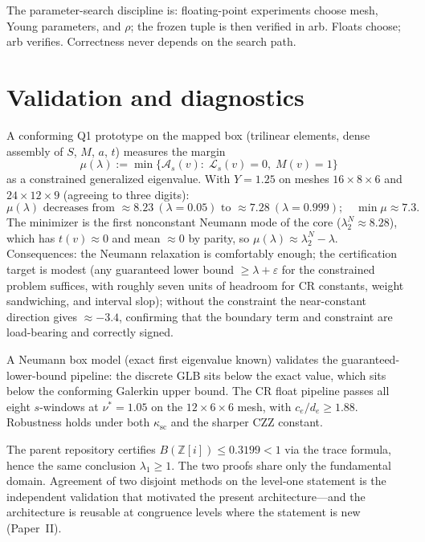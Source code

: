 \documentclass[11pt]{amsart}
\newcommand{\ZZ}{\mathbb{Z}}
\begin{document}
The parameter-search discipline is: floating-point experiments choose
mesh, Young parameters, and $\rho$; the frozen tuple is then verified in
arb.  Floats choose; arb verifies.  Correctness never depends on the
search path.

\section{Validation and diagnostics}\label{sec:valid}

A conforming Q1 prototype on the mapped box
(trilinear elements, dense assembly of $S$, $M$, $a$, $t$) measures the
margin
\[
  \mu(\lambda):=\min\bigl\{\mathcal{A}_s(v):\;\mathcal{L}_s(v)=0,\;
  M(v)=1\bigr\}
\]
as a constrained generalized eigenvalue.  With $Y=1.25$ on meshes
$16\times 8\times 6$ and $24\times 12\times 9$ (agreeing to three digits):
\[
  \mu(\lambda)\text{ decreases from }\approx 8.23\ (\lambda=0.05)
  \text{ to }\approx 7.28\ (\lambda=0.999);\quad
  \min\mu\approx 7.3.
\]
The minimizer is the first nonconstant Neumann mode of the core
($\lambda_2^N\approx 8.28$), which has $t(v)\approx 0$ and mean $\approx 0$
by parity, so $\mu(\lambda)\approx\lambda_2^N-\lambda$.  Consequences:
the Neumann relaxation is comfortably enough; the certification target
is modest (any guaranteed lower bound $\ge\lambda+\varepsilon$ for the
constrained problem suffices, with roughly seven units of headroom for CR
constants, weight sandwiching, and interval slop); without the
constraint the near-constant direction gives $\approx-3.4$, confirming
that the boundary term and constraint are load-bearing and correctly
signed.

A Neumann box model (exact first eigenvalue known) validates the
guaranteed-lower-bound pipeline: the discrete GLB sits below the exact
value, which sits below the conforming Galerkin upper bound.  The CR
float pipeline passes all eight $s$-windows at $\nu^*=1.05$ on the
$12\times 6\times 6$ mesh, with $c_e/d_e\ge 1.88$.  Robustness holds under
both $\kappa_{\mathrm{sc}}$ and the sharper CZZ constant.

The parent repository certifies $B(\ZZ[i])\le 0.3199<1$ via the trace
formula, hence the same conclusion $\lambda_1\ge 1$.  The two proofs share
only the fundamental domain.  Agreement of two disjoint methods on the
level-one statement is the independent validation that motivated the
present architecture---and the architecture is reusable at congruence
levels where the statement is new (Paper~II).
\end{document}
